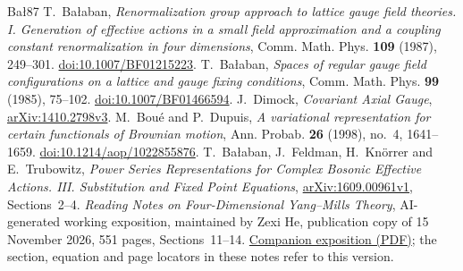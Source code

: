 \documentclass[10pt,reqno]{amsart}
\theoremstyle{definition}
\theoremstyle{remark}
\numberwithin{equation}{section}
\numberwithin{figure}{section}
\begin{document}
\begin{thebibliography}{Ba{\l}87}
T.~Ba{\l}aban,
\emph{Renormalization group approach to lattice gauge field theories.
I. Generation of effective actions in a small field approximation
and a coupling constant renormalization in four dimensions},
Comm. Math. Phys. \textbf{109} (1987), 249--301.
\href{https://doi.org/10.1007/BF01215223}{doi:10.1007/BF01215223}.
T.~Ba{\l}aban,
\emph{Spaces of regular gauge field configurations on a lattice
and gauge fixing conditions},
Comm. Math. Phys. \textbf{99} (1985), 75--102.
\href{https://doi.org/10.1007/BF01466594}{doi:10.1007/BF01466594}.
J.~Dimock,
\emph{Covariant Axial Gauge},
\href{https://arxiv.org/abs/1410.2798v3}{arXiv:1410.2798v3}.
M.~Bou\'e and P.~Dupuis,
\emph{A variational representation for certain functionals of Brownian motion},
Ann. Probab. \textbf{26} (1998), no.~4, 1641--1659.
\href{https://doi.org/10.1214/aop/1022855876}{doi:10.1214/aop/1022855876}.
T.~Ba{\l}aban, J.~Feldman, H.~Kn\"orrer and E.~Trubowitz,
\emph{Power Series Representations for Complex Bosonic Effective Actions.
III. Substitution and Fixed Point Equations},
\href{https://arxiv.org/abs/1609.00961v1}{arXiv:1609.00961v1},
Sections~2--4.
\emph{Reading Notes on Four-Dimensional Yang--Mills Theory},
AI-generated working exposition, maintained by Zexi He, publication copy of
15 November 2026, 551 pages, Sections~11--14.
\href{../4DYM_reading_notes.pdf}{Companion exposition (PDF)}; the section, equation
and page locators in these notes refer to this version.
\end{thebibliography}
\end{document}
